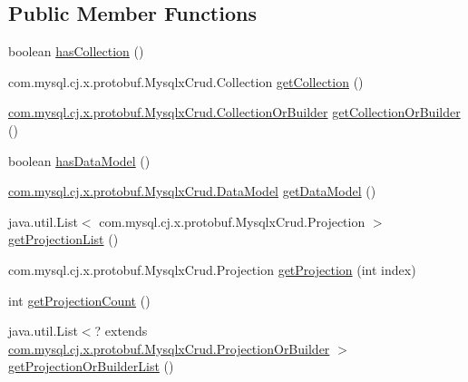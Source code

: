 \subsection*{Public Member Functions}
\begin{DoxyCompactItemize}
\item 
boolean \mbox{\hyperlink{interfacecom_1_1mysql_1_1cj_1_1x_1_1protobuf_1_1_mysqlx_crud_1_1_find_or_builder_a3d288a974fb0e51272f064a073414e57}{has\+Collection}} ()
\item 
com.\+mysql.\+cj.\+x.\+protobuf.\+Mysqlx\+Crud.\+Collection \mbox{\hyperlink{interfacecom_1_1mysql_1_1cj_1_1x_1_1protobuf_1_1_mysqlx_crud_1_1_find_or_builder_a440f6f1eb34474d42ed72c919b07e70d}{get\+Collection}} ()
\item 
\mbox{\hyperlink{interfacecom_1_1mysql_1_1cj_1_1x_1_1protobuf_1_1_mysqlx_crud_1_1_collection_or_builder}{com.\+mysql.\+cj.\+x.\+protobuf.\+Mysqlx\+Crud.\+Collection\+Or\+Builder}} \mbox{\hyperlink{interfacecom_1_1mysql_1_1cj_1_1x_1_1protobuf_1_1_mysqlx_crud_1_1_find_or_builder_ab955daf8194b39f937295a8f383914b0}{get\+Collection\+Or\+Builder}} ()
\item 
boolean \mbox{\hyperlink{interfacecom_1_1mysql_1_1cj_1_1x_1_1protobuf_1_1_mysqlx_crud_1_1_find_or_builder_a35417024e12958a42e8e18216c019f7f}{has\+Data\+Model}} ()
\item 
\mbox{\hyperlink{enumcom_1_1mysql_1_1cj_1_1x_1_1protobuf_1_1_mysqlx_crud_1_1_data_model}{com.\+mysql.\+cj.\+x.\+protobuf.\+Mysqlx\+Crud.\+Data\+Model}} \mbox{\hyperlink{interfacecom_1_1mysql_1_1cj_1_1x_1_1protobuf_1_1_mysqlx_crud_1_1_find_or_builder_adeed43b0ab64fd5561c86f17d86eabd4}{get\+Data\+Model}} ()
\item 
java.\+util.\+List$<$ com.\+mysql.\+cj.\+x.\+protobuf.\+Mysqlx\+Crud.\+Projection $>$ \mbox{\hyperlink{interfacecom_1_1mysql_1_1cj_1_1x_1_1protobuf_1_1_mysqlx_crud_1_1_find_or_builder_a85bb85659b912069466f4b24dca50473}{get\+Projection\+List}} ()
\item 
com.\+mysql.\+cj.\+x.\+protobuf.\+Mysqlx\+Crud.\+Projection \mbox{\hyperlink{interfacecom_1_1mysql_1_1cj_1_1x_1_1protobuf_1_1_mysqlx_crud_1_1_find_or_builder_a323b3ca0ac4cc9e4c437b6b1513cd7ad}{get\+Projection}} (int index)
\item 
int \mbox{\hyperlink{interfacecom_1_1mysql_1_1cj_1_1x_1_1protobuf_1_1_mysqlx_crud_1_1_find_or_builder_a51cf98c2cb6621afa7bddd5edb49ca1b}{get\+Projection\+Count}} ()
\item 
java.\+util.\+List$<$? extends \mbox{\hyperlink{interfacecom_1_1mysql_1_1cj_1_1x_1_1protobuf_1_1_mysqlx_crud_1_1_projection_or_builder}{com.\+mysql.\+cj.\+x.\+protobuf.\+Mysqlx\+Crud.\+Projection\+Or\+Builder}} $>$ \mbox{\hyperlink{interfacecom_1_1mysql_1_1cj_1_1x_1_1protobuf_1_1_mysqlx_crud_1_1_find_or_builder_a1fe78740223d9414270c73c754108180}{get\+Projection\+Or\+Builder\+List}} ()

\end{DoxyCompactItemize}
